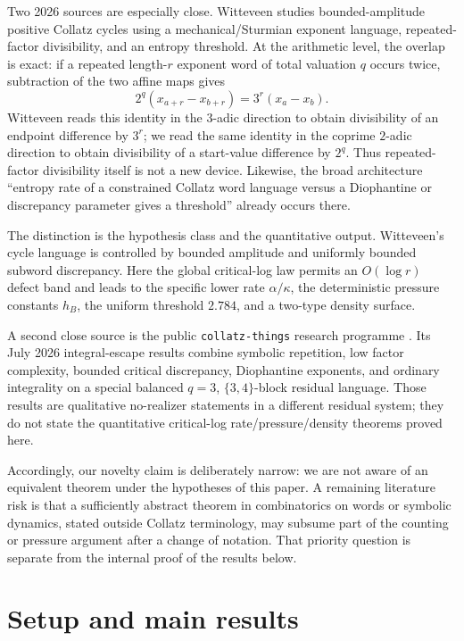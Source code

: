 \documentclass[11pt]{amsart}
\begin{document}
Two 2026 sources are especially close.  Witteveen \cite{Witteveen2026} studies bounded-amplitude positive Collatz cycles using a mechanical/Sturmian exponent language, repeated-factor divisibility, and an entropy threshold.  At the arithmetic level, the overlap is exact: if a repeated length-\(r\) exponent word of total valuation \(q\) occurs twice, subtraction of the two affine maps gives
\[
 2^q(x_{a+r}-x_{b+r})=3^r(x_a-x_b).
\]
Witteveen reads this identity in the \(3\)-adic direction to obtain divisibility of an endpoint difference by \(3^r\); we read the same identity in the coprime \(2\)-adic direction to obtain divisibility of a start-value difference by \(2^q\).  Thus repeated-factor divisibility itself is not a new device.  Likewise, the broad architecture ``entropy rate of a constrained Collatz word language versus a Diophantine or discrepancy parameter gives a threshold'' already occurs there.

The distinction is the hypothesis class and the quantitative output.  Witteveen's cycle language is controlled by bounded amplitude and uniformly bounded subword discrepancy.  Here the global critical-log law permits an \(O(\log r)\) defect band and leads to the specific lower rate \(\alpha/\kappa\), the deterministic pressure constants \(h_B\), the uniform threshold \(2.784\), and a two-type density surface.

A second close source is the public \texttt{collatz-things} research programme \cite{CollatzThings2026}.  Its July 2026 integral-escape results combine symbolic repetition, low factor complexity, bounded critical discrepancy, Diophantine exponents, and ordinary integrality on a special balanced \(q=3\), \(\{3,4\}\)-block residual language.  Those results are qualitative no-realizer statements in a different residual system; they do not state the quantitative critical-log rate/pressure/density theorems proved here.

Accordingly, our novelty claim is deliberately narrow: we are not aware of an equivalent theorem under the hypotheses of this paper.  A remaining literature risk is that a sufficiently abstract theorem in combinatorics on words or symbolic dynamics, stated outside Collatz terminology, may subsume part of the counting or pressure argument after a change of notation.  That priority question is separate from the internal proof of the results below.

\section{Setup and main results}
\end{document}
